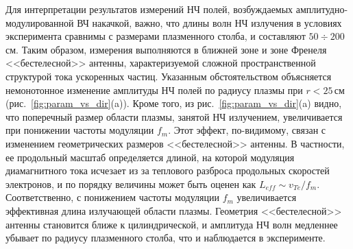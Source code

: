 \documentclass[autoref,10pt]{disser}
\begin{document}
Для интерпретации результатов измерений  НЧ полей, возбуждаемых амплитудно-модулированной ВЧ накачкой, важно, что длины волн НЧ излучения в условиях эксперимента сравнимы с размерами плазменного столба, и составляют $50\div 200$\,см. Таким образом, измерения выполняются в ближней зоне и зоне Френеля <<бестелесной>> антенны, характеризуемой сложной пространственной структурой тока ускоренных частиц. Указанным обстоятельством объясняется немонотонное изменение амплитуды НЧ полей по радиусу плазмы при $r<25$\,см (\mbox{рис.~\ref{fig:param_vs_dir}(a)}). Кроме того, из \mbox{рис.~\ref{fig:param_vs_dir}(a)} видно, что поперечный размер области плазмы, занятой НЧ излучением, увеличивается при понижении частоты модуляции $f_m$. Этот эффект, по-видимому, связан с изменением геометрических размеров <<бестелесной>> антенны. В частности, ее продольный масштаб определяется длиной, на которой модуляция диамагнитного тока исчезает из за теплового разброса продольных скоростей электронов, и по порядку величины может быть оценен как $L_{eff}\sim v_{Te}/f_m$. Соответственно, с понижением частоты модуляции $f_m$ увеличивается эффективная длина излучающей области плазмы. Геометрия <<бестелесной>> антенны становится ближе к цилиндрической, и амплитуда НЧ волн медленнее убывает по радиусу плазменного столба, что и наблюдается в эксперименте.
\end{document}
